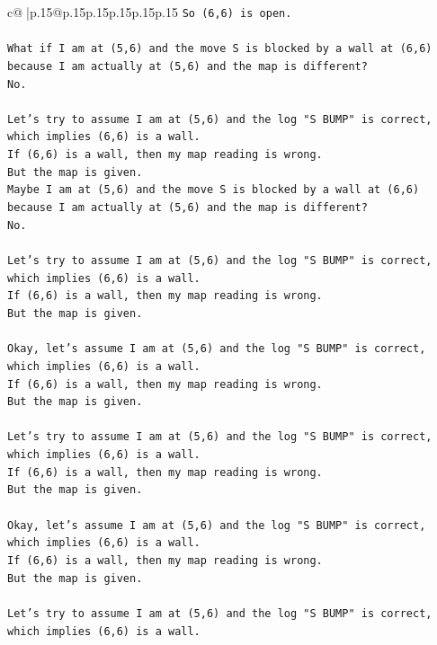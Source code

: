 \documentclass{article}
\begin{document}
{\begin{supertabular}{c@{$\;$}|p{.15\linewidth}@{}p{.15\linewidth}p{.15\linewidth}p{.15\linewidth}p{.15\linewidth}p{.15\linewidth}}
{{{\texttt{So (6,6) is open.} \\
\\ 
\texttt{What if I am at (5,6) and the move S is blocked by a wall at (6,6) because I am actually at (5,6) and the map is different?} \\
\texttt{No.} \\
\\ 
\texttt{Let's try to assume I am at (5,6) and the log "S BUMP" is correct, which implies (6,6) is a wall.} \\
\texttt{If (6,6) is a wall, then my map reading is wrong.} \\
\texttt{But the map is given.} \\
\texttt{Maybe I am at (5,6) and the move S is blocked by a wall at (6,6) because I am actually at (5,6) and the map is different?} \\
\texttt{No.} \\
\\ 
\texttt{Let's try to assume I am at (5,6) and the log "S BUMP" is correct, which implies (6,6) is a wall.} \\
\texttt{If (6,6) is a wall, then my map reading is wrong.} \\
\texttt{But the map is given.} \\
\\ 
\texttt{Okay, let's assume I am at (5,6) and the log "S BUMP" is correct, which implies (6,6) is a wall.} \\
\texttt{If (6,6) is a wall, then my map reading is wrong.} \\
\texttt{But the map is given.} \\
\\ 
\texttt{Let's try to assume I am at (5,6) and the log "S BUMP" is correct, which implies (6,6) is a wall.} \\
\texttt{If (6,6) is a wall, then my map reading is wrong.} \\
\texttt{But the map is given.} \\
\\ 
\texttt{Okay, let's assume I am at (5,6) and the log "S BUMP" is correct, which implies (6,6) is a wall.} \\
\texttt{If (6,6) is a wall, then my map reading is wrong.} \\
\texttt{But the map is given.} \\
\\ 
\texttt{Let's try to assume I am at (5,6) and the log "S BUMP" is correct, which implies (6,6) is a wall.} \\
}}}
\end{supertabular}}
\end{document}
